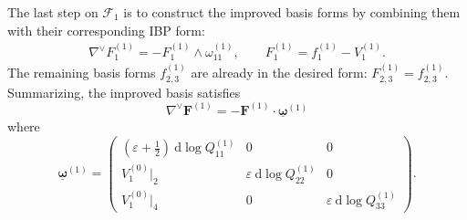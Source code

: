 \documentclass[11pt]{article}
\renewcommand{\d}{\text{d}}
\newcommand{\be}{\begin{equation}}
\newcommand{\ee}{\end{equation}}
\newcommand{\F}{\mathcal{F}}
\newcommand{\vep}{\varepsilon}
\newcommand{\bs}[1]{\boldsymbol{#1}}
\newcommand{\mat}[1]{\underline{\boldsymbol{#1}}}
\begin{document}
The last step on $\F_1$ is to construct the improved basis forms by combining them with their corresponding IBP form:
\begin{align}
	\nabla^\vee F^{(1)}_1 = - F^{(1)}_1 \wedge \omega^{(1)}_{11},
	\qquad 
	F_1^{(1)}=f_1^{(1)}-V_1^{(1)}.
\end{align}
The remaining basis forms $f^{(1)}_{2,3}$ are already in the desired form: $F^{(1)}_{2,3}=f^{(1)}_{2,3}$. Summarizing, the improved basis satisfies
\be
	\nabla^\vee \bs{F}^{(1)} = - \bs{F}^{(1)} \cdot \mat{\omega}^{(1)}
\ee 
where 
\be
	\mat{\omega}^{(1)} = 
	\begin{pmatrix}
		(\vep{+}\frac12)\ \d\log Q^{(1)}_{11} & 0 & 0
		\\
		V^{(0)}_1\vert_2 & \vep\ \d\log Q^{(1)}_{22} & 0 
		\\
		V^{(0)}_1\vert_4 & 0 & \vep\ \d\log Q^{(1)}_{33}
	\end{pmatrix}.
\ee
\end{document}
